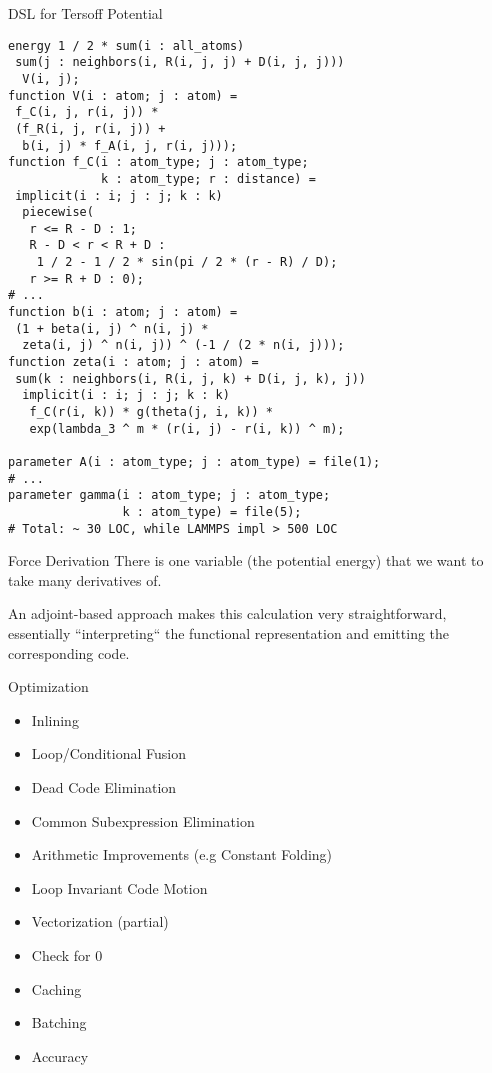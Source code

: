 \begin{frame}[fragile]{}
\begin{columns}[onlytextwidth]
\begin{column}{2cm}
\end{column}%
%
\begin{column}{26.02cm}%
%
\begin{block}{DSL for Tersoff Potential}%
%
\vspace{-0.5cm}%
\begin{lstlisting}[language=potc, basicstyle=\small\ttfamily]
energy 1 / 2 * sum(i : all_atoms)
 sum(j : neighbors(i, R(i, j, j) + D(i, j, j)))
  V(i, j);
function V(i : atom; j : atom) = 
 f_C(i, j, r(i, j)) * 
 (f_R(i, j, r(i, j)) + 
  b(i, j) * f_A(i, j, r(i, j)));
function f_C(i : atom_type; j : atom_type;
             k : atom_type; r : distance) = 
 implicit(i : i; j : j; k : k)
  piecewise(
   r <= R - D : 1; 
   R - D < r < R + D : 
    1 / 2 - 1 / 2 * sin(pi / 2 * (r - R) / D); 
   r >= R + D : 0);
# ...
function b(i : atom; j : atom) =
 (1 + beta(i, j) ^ n(i, j) * 
  zeta(i, j) ^ n(i, j)) ^ (-1 / (2 * n(i, j)));
function zeta(i : atom; j : atom) =
 sum(k : neighbors(i, R(i, j, k) + D(i, j, k), j))
  implicit(i : i; j : j; k : k)
   f_C(r(i, k)) * g(theta(j, i, k)) * 
   exp(lambda_3 ^ m * (r(i, j) - r(i, k)) ^ m);

parameter A(i : atom_type; j : atom_type) = file(1);
# ...
parameter gamma(i : atom_type; j : atom_type;
                k : atom_type) = file(5);
# Total: ~ 30 LOC, while LAMMPS impl > 500 LOC
\end{lstlisting}

\end{block}
%
\begin{block}{Force Derivation}%
There is one variable (the potential energy) that we want to take many derivatives of.

An adjoint-based approach makes this calculation very straightforward, essentially ``interpreting`` the functional representation and emitting the corresponding code.
\end{block}%
%
\begin{block}{Optimization}%
%
\vspace*{-0.5cm}%
\begin{itemize}
\item Inlining
\item Loop/Conditional Fusion
\item Dead Code Elimination
\item Common Subexpression Elimination
\item Arithmetic Improvements (e.g Constant Folding)
\item Loop Invariant Code Motion
\item Vectorization (partial)
\color{magenta}
\item Check for 0
\item Caching
\item Batching
\item Accuracy
\end{itemize}


\end{block}
\end{column}
\end{columns}
\end{frame}
